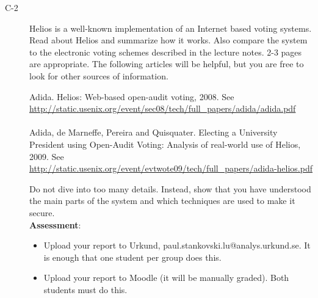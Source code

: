 \documentclass{article}
\begin{document}
\begin{description}
	\item[C-2]{Helios is a well-known implementation of an Internet based voting systems. Read about Helios and summarize how it works. Also compare the system to the electronic voting schemes described in the lecture notes. 2-3 pages are appropriate. The following articles will be helpful, but you are free to look for other sources of information.
\begin{center}
\begin{minipage}{0.8\textwidth}
Adida. Helios: Web-based open-audit voting, 2008. See \href{http://static.usenix.org/event/sec08/tech/full\_papers/adida/adida.pdf}{http://static.usenix.org/event/sec08/tech/full\_papers/adida/adida.pdf}\\\\
Adida, de Marneffe, Pereira and Quisquater. Electing a University President using Open-Audit Voting: Analysis of real-world use of Helios, 2009. See \href{http://static.usenix.org/event/evtwote09/tech/full\_papers/adida-helios.pdf}{http://static.usenix.org/event/evtwote09/tech/full\_papers/adida-helios.pdf}
\end{minipage}
\end{center}
Do not dive into too many details. Instead, show that you have understood the main parts of the system and which techniques are used to make it secure.\\
	\textbf{Assessment}:
	\begin{itemize}
		\item Upload your report to Urkund, paul.stankovski.lu@analys.urkund.se. It is enough that one student per group does this.
		\item Upload your report to Moodle (it will be manually graded). Both students must do this.
	\end{itemize}
	}
\end{description}
\end{document}
